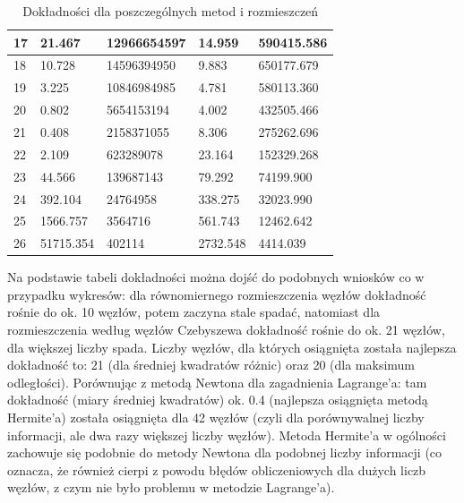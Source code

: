 \documentclass{article}
\begin{document}
\begin{table}[H]
\begin{tabular}{|l|ll|ll|}
    17& \multicolumn{1}{l|}{21.467}  &  12966654597 & \multicolumn{1}{l|}{14.959}  & 590415.586  \\ \hline
    18& \multicolumn{1}{l|}{10.728}  & 14596394950 & \multicolumn{1}{l|}{9.883}  &  650177.679 \\ \hline
    19& \multicolumn{1}{l|}{3.225}  &  10846984985 & \multicolumn{1}{l|}{4.781}  &  580113.360 \\ \hline
    20& \multicolumn{1}{l|}{0.802}  &  5654153194 & \multicolumn{1}{l|}{4.002}  & 432505.466  \\ \hline
    21& \multicolumn{1}{l|}{0.408}  & 2158371055  & \multicolumn{1}{l|}{8.306}  &  275262.696 \\ \hline
    22& \multicolumn{1}{l|}{2.109}  & 623289078  & \multicolumn{1}{l|}{23.164}  &  152329.268 \\ \hline
    23& \multicolumn{1}{l|}{44.566}  & 139687143  & \multicolumn{1}{l|}{79.292}  &  74199.900 \\ \hline
    24& \multicolumn{1}{l|}{392.104}  &  24764958 & \multicolumn{1}{l|}{338.275}  &  32023.990 \\ \hline
    25& \multicolumn{1}{l|}{1566.757}  &  3564716 & \multicolumn{1}{l|}{561.743}  &  12462.642 \\ \hline
    26& \multicolumn{1}{l|}{51715.354}  &  402114 & \multicolumn{1}{l|}{2732.548}  &  4414.039 \\ \hline
    \end{tabular}
    \caption{Dokładności dla poszczególnych metod i rozmieszczeń}
\end{table}

Na podstawie tabeli dokładności można dojść do podobnych wniosków co w przypadku wykresów: dla równomiernego rozmieszczenia
węzłów dokładność rośnie do ok. 10 węzłów, potem zaczyna stale spadać, natomiast dla rozmieszczenia według węzłów Czebyszewa
dokładność rośnie do ok. 21 węzłów, dla większej liczby spada. Liczby węzłów, dla których osiągnięta została najlepsza dokładność
to: 21 (dla średniej kwadratów różnic) oraz 20 (dla maksimum odległości).
Porównując z metodą Newtona dla zagadnienia Lagrange'a: tam dokładność (miary średniej kwadratów) ok. 0.4 (najlepsza osiągnięta metodą Hermite'a) 
została osiągnięta dla 42 węzłów (czyli dla porównywalnej liczby informacji, ale dwa razy większej liczby węzłów). Metoda 
Hermite'a w ogólności zachowuje się podobnie do metody Newtona dla podobnej liczby informacji (co oznacza, że również cierpi
z powodu błędów obliczeniowych dla dużych liczb węzłów, z czym nie było problemu w metodzie Lagrange'a).
\end{document}
